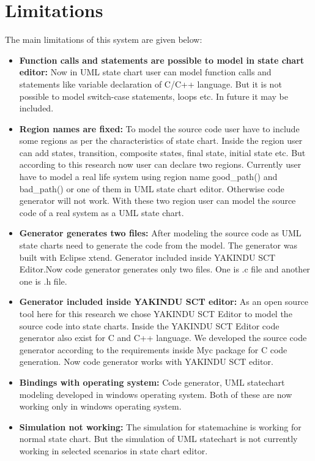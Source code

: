 \chapter{Limitations}
The main limitations of this system are given below:
\begin{itemize}
	\item \textbf{Function calls and statements are possible to model in state chart editor:} Now in UML state chart user can model function calls and statements like variable declaration of C/C++ language. But it is not possible to model switch-case statements, loops etc. In future it may be included.
	
	\item \textbf{Region names are fixed:} To model the source code user have to include some regions as per the characteristics of state chart. Inside the region user can add states, transition, composite states, final state, initial state etc. But according to this research now user can declare two regions. Currently user have to model a real life system using region name good\_path() and bad\_path() or one of them in UML state chart editor. Otherwise code generator will not work. With these two region user can model the source code of a real system as a UML state chart. 
	
	\item \textbf{Generator generates two files:} After modeling the source code as UML state charts need to generate the code from the model. The generator was built with Eclipse xtend. Generator included inside YAKINDU SCT Editor.Now code generator generates only two files. One is .c file and another one is .h file.
	
	\item \textbf{Generator included inside YAKINDU SCT editor:} As an open source tool here for this research we chose YAKINDU SCT Editor to model the source code into state charts. Inside the YAKINDU SCT Editor code generator also exist for C and C++ language. We developed the source code generator according to the requirements inside Myc package for C code generation. Now code generator works with YAKINDU SCT editor.
	
	
	\item \textbf{Bindings with operating system:}  Code generator, UML statechart modeling developed in windows operating system. Both of these are now working only in windows operating system.
	
	\item \textbf{Simulation not working:} The simulation for statemachine is working for normal state chart. But the simulation of UML statechart is not currently working in selected scenarios in state chart editor.
	

\end{itemize}
